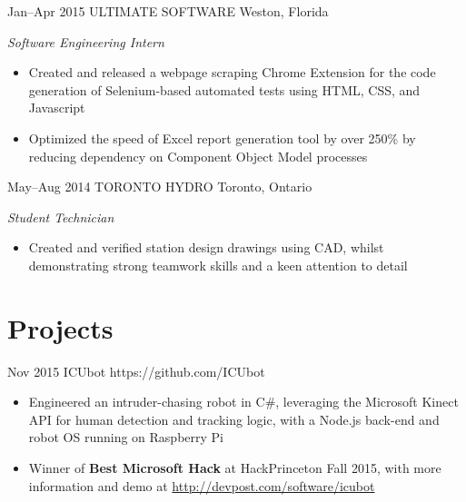 \documentclass[print]{friggeri-cv} %
\begin{document}
\begin{entrylist}
\entry
{Jan--Apr 2015}
{ULTIMATE SOFTWARE}
{Weston, Florida}
{\emph{Software Engineering Intern}
\begin{itemize}
\item Created and released a webpage scraping Chrome Extension for the code generation of Selenium-based automated tests using HTML, CSS, and Javascript 
\item Optimized the speed of Excel report generation tool by over 250\% by reducing dependency on Component Object Model processes
\end{itemize}}
\end{entrylist}


\begin{entrylist}
\entry
{May--Aug 2014}
{TORONTO HYDRO}
{Toronto, Ontario}
{\emph{Student Technician}
\begin{itemize}
\item Created and verified station design drawings using CAD, whilst \\ demonstrating strong teamwork skills and a keen attention to detail  
\end{itemize}
}
\end{entrylist}


\section{Projects}

\begin{projlist}
\proj
{Nov 2015}
{ICUbot}
{https://github.com/ICUbot}
{
\begin{itemize}
\item Engineered an intruder-chasing robot in C\#, leveraging the Microsoft Kinect API for human detection and tracking logic, with a Node.js back-end and robot OS running on Raspberry Pi
\item Winner of \textbf{Best Microsoft Hack} at HackPrinceton Fall 2015, with more information and demo at \href{http://devpost.com/software/icubot}{http://devpost.com/software/icubot}
\end{itemize}}
\end{projlist}
\end{document}
